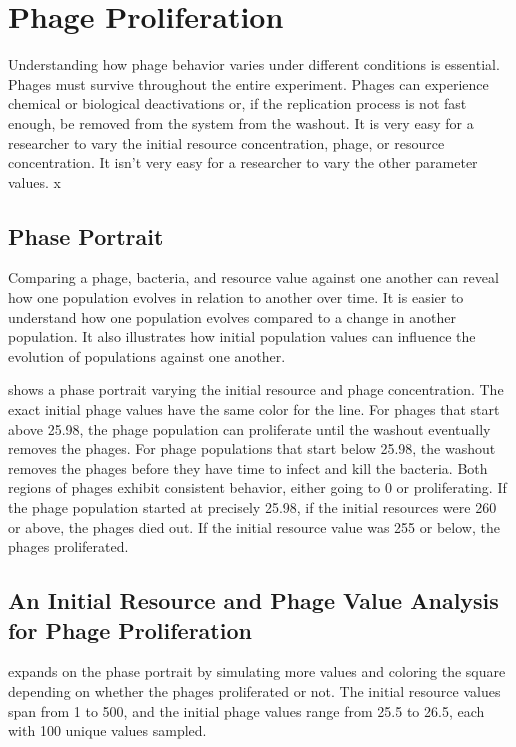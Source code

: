 \section{Phage Proliferation}
Understanding how phage behavior varies under different conditions is essential. 
Phages must survive throughout the entire experiment. 
Phages can experience chemical or biological deactivations or, if the replication process is not fast enough, be removed from the system from the washout. 
It is very easy for a researcher to vary the initial resource concentration, phage, or resource concentration. 
It isn't very easy for a researcher to vary the other parameter values. x

\subsection{Phase Portrait}
\label{sec:results:phase_portrait}
Comparing a phage, bacteria, and resource value against one another can reveal how one population evolves in relation to another over time. 
It is easier to understand how one population evolves compared to a change in another population. 
It also illustrates how initial population values can influence the evolution of populations against one another. 

 shows a phase portrait varying the initial resource and phage concentration. 
The exact initial phage values have the same color for the line. 
For phages that start above 25.98, the phage population can proliferate until the washout eventually removes the phages. 
For phage populations that start below 25.98, the washout removes the phages before they have time to infect and kill the bacteria. 
Both regions of phages exhibit consistent behavior, either going to 0 or proliferating. 
If the phage population started at precisely 25.98, if the initial resources were 260 or above, the phages died out. 
If the initial resource value was 255 or below, the phages proliferated. 

\subsection{An Initial Resource and Phage Value Analysis for Phage Proliferation}
 expands on the phase portrait by simulating more values and coloring the square depending on whether the phages proliferated or not. 
The initial resource values span from 1 to 500, and the initial phage values range from 25.5 to 26.5, each with 100 unique values sampled.

